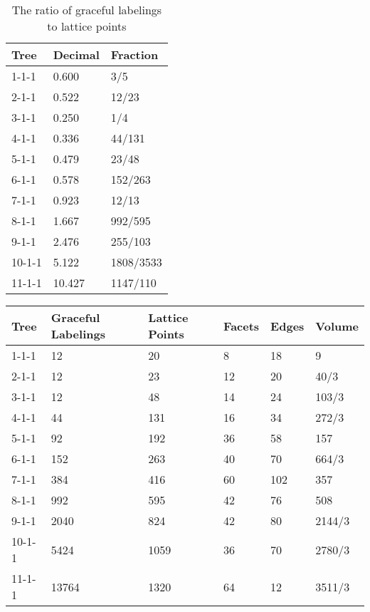 \documentclass{article}
\begin{document}
\begin{table}
\centering
\caption{The ratio of graceful labelings to lattice points}
	\begin{tabular}{|l|l|l|}
		\hline
Tree & Decimal & Fraction \\
\hline 
1-1-1 & 0.600 & 3/5\\
\hline
2-1-1 & 0.522 & 12/23\\
\hline
3-1-1 & 0.250 & 1/4\\
\hline
4-1-1 & 0.336 & 44/131\\
\hline
5-1-1 & 0.479 & 23/48\\
\hline
6-1-1 & 0.578 & 152/263\\
\hline
7-1-1 & 0.923 & 12/13\\
\hline
8-1-1 & 1.667 & 992/595\\
\hline
9-1-1 & 2.476 & 255/103\\
\hline
10-1-1 & 5.122 & 1808/3533\\
\hline
11-1-1 & 10.427 & 1147/110\\
\hline
	\end{tabular}
\end{table}


\begin{table}
\centering
	\begin{tabular}{|l|l|l|l|l|l|}
		\hline
Tree & Graceful Labelings & Lattice Points & Facets & Edges & Volume \\
\hline 
1-1-1 & 12 & 20 & 8 & 18 & 9\\
\hline
2-1-1 & 12 & 23 & 12 & 20 & 40/3\\
\hline
3-1-1 & 12 & 48 & 14 & 24 & 103/3\\
\hline
4-1-1 & 44 & 131 & 16 & 34 & 272/3\\
\hline
5-1-1 & 92 & 192 & 36 & 58 & 157\\
\hline
6-1-1 & 152 & 263 & 40 & 70 & 664/3\\
\hline
7-1-1 & 384 & 416 & 60 & 102 & 357\\
\hline
8-1-1 & 992 & 595 & 42 & 76 & 508 \\
\hline
9-1-1 & 2040 & 824 & 42 & 80 & 2144/3\\
\hline
10-1-1 & 5424 & 1059 & 36 & 70 & 2780/3\\
\hline
11-1-1 & 13764 & 1320 & 64 & 12 & 3511/3\\
\hline
	\end{tabular}
\end{table}
\end{document}
